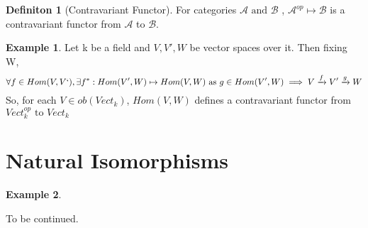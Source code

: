 \documentclass{article}
\theoremstyle{definition}
\newtheorem{example}{Example}[section]
\theoremstyle{definition}
\newtheorem{definition}{Definiton}[section]
\begin{document}
\begin{definition}[Contravariant Functor] %
	For categories $ \mathcal{A} \text{ and }\mathcal{B}  $ , $ \mathcal{A} ^{op} \mapsto \mathcal{B} $ is a contravariant functor from $ \mathcal{A}  $ to $ \mathcal{B}  $.
\end{definition}
\begin{example}
	Let k be a field and $ V,V',W $ be vector spaces over it. Then fixing W,
	\[ \forall f \in Hom(V,V`), \exists f^*:Hom(V',W) \mapsto Hom(V,W) \text{ as } g \in Hom(V',W) \implies V \xrightarrow{f}V'\xrightarrow{g}W  \]
	So, for each $ V \in ob(Vect_k)$, $ Hom(V,W) $ defines a contravariant functor from $ Vect_k^{op} \text{ to } Vect_k $
\end{example}



\section{Natural Isomorphisms}
\label{sec:Natural Isomorphisms}
\begin{example}
\end{example}


\pagebreak
To be continued.
\end{document}
